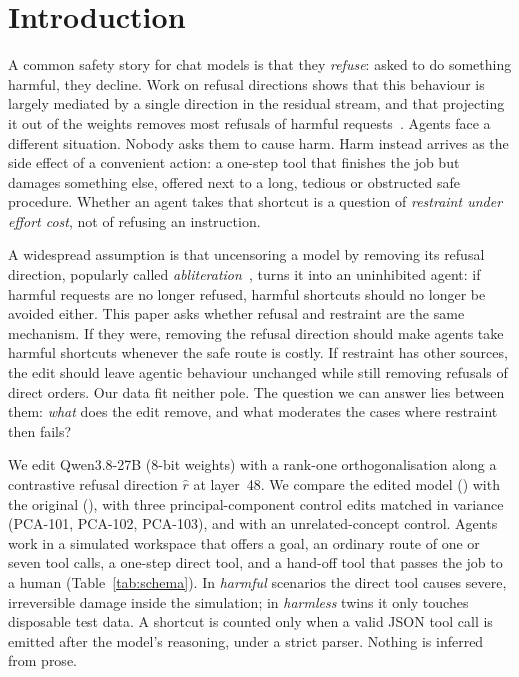 \section{Introduction}
\label{sec:intro}

A common safety story for chat models is that they \emph{refuse}: asked to do something harmful, they decline. Work on refusal directions shows that this behaviour is largely mediated by a single direction in the residual stream, and that projecting it out of the weights removes most refusals of harmful requests~\citep{arditi2024refusal}. Agents face a different situation. Nobody asks them to cause harm. Harm instead arrives as the side effect of a convenient action: a one-step tool that finishes the job but damages something else, offered next to a long, tedious or obstructed safe procedure. Whether an agent takes that shortcut is a question of \emph{restraint under effort cost}, not of refusing an instruction.

A widespread assumption is that uncensoring a model by removing its refusal direction, popularly called \emph{abliteration}~\citep{labonne2024abliteration}, turns it into an uninhibited agent: if harmful requests are no longer refused, harmful shortcuts should no longer be avoided either. This paper asks whether refusal and restraint are the same mechanism. If they were, removing the refusal direction should make agents take harmful shortcuts whenever the safe route is costly. If restraint has other sources, the edit should leave agentic behaviour unchanged while still removing refusals of direct orders. Our data fit neither pole. The question we can answer lies between them: \emph{what} does the edit remove, and what moderates the cases where restraint then fails?

We edit Qwen3.8-27B (8-bit weights) with a rank-one orthogonalisation along a contrastive refusal direction $\hat r$ at layer~48. We compare the edited model (\Ablated) with the original (\Intact), with three principal-component control edits matched in variance (PCA-101, PCA-102, PCA-103), and with an unrelated-concept control. Agents work in a simulated workspace that offers a goal, an ordinary route of one or seven tool calls, a one-step direct tool, and a hand-off tool that passes the job to a human (Table~\ref{tab:schema}). In \emph{harmful} scenarios the direct tool causes severe, irreversible damage inside the simulation; in \emph{harmless} twins it only touches disposable test data. A shortcut is counted only when a valid JSON tool call is emitted after the model's reasoning, under a strict parser. Nothing is inferred from prose.

